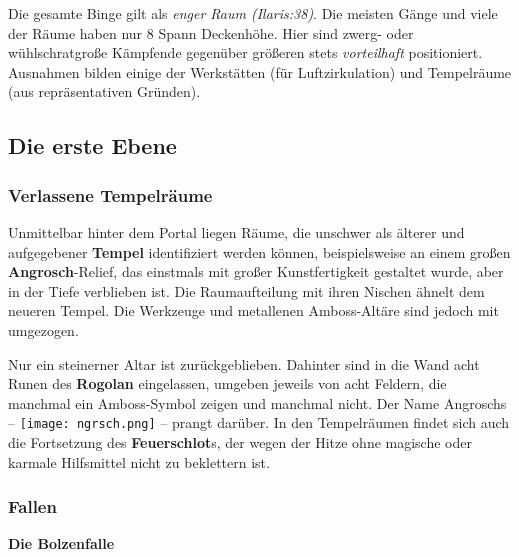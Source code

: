 Die gesamte Binge gilt als \emph{enger Raum (Ilaris:38)}.
Die meisten Gänge und viele der Räume haben nur 8 Spann Deckenhöhe.
Hier sind zwerg- oder wühlschratgroße Kämpfende gegenüber größeren stets \emph{vorteilhaft} positioniert.
Ausnahmen bilden einige der Werkstätten (für Luftzirkulation) und  Tempelräume (aus repräsentativen Gründen).

\subsection{Die erste Ebene}

\subsubsection{Verlassene Tempelräume}
Unmittelbar hinter dem Portal liegen Räume, die unschwer als älterer und aufgegebener \textbf{Tempel} identifiziert werden können,
beispielsweise an einem großen \textbf{Angrosch}-Relief, das einstmals mit großer Kunstfertigkeit gestaltet wurde, aber in der Tiefe verblieben ist.
Die Raumaufteilung mit ihren Nischen ähnelt dem neueren Tempel.
Die Werkzeuge und metallenen Amboss-Altäre sind jedoch mit umgezogen.

Nur ein steinerner Altar ist zurückgeblieben. Dahinter sind in die Wand acht Runen des \textbf{Rogolan} eingelassen, umgeben jeweils von acht Feldern, die manchmal ein Amboss-Symbol zeigen und manchmal nicht.
Der Name Angroschs -- \texttt{[image: ngrsch.png]} --
prangt darüber.
In den Tempelräumen findet sich auch die Fortsetzung des \textbf{Feuerschlot}s, der wegen der Hitze ohne magische oder karmale Hilfsmittel nicht zu beklettern ist.

\subsubsection{Fallen}

\textbf{Die Bolzenfalle}

